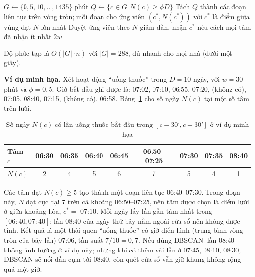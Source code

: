 \begin{algorithm}[htbp]
\caption{Tìm thói quen của một hoạt động trên một loại ngày (quét cửa sổ)}
\label{alg:scan}
$G \leftarrow \{0, 5, 10, \dots, 1435\}$ phút 
$Q \leftarrow \{ c \in G : N(c) \ge \phi D\}$\;
Tách $Q$ thành các đoạn liên tục trên vòng tròn; mỗi đoạn cho ứng viên $(c^\ast, N(c^\ast))$ với
$c^\ast$ là điểm giữa vùng đạt $N$ lớn nhất\;
Duyệt ứng viên theo $N$ giảm dần, nhận $c^\ast$ nếu cách mọi tâm đã nhận ít nhất $2w$\;
\end{algorithm}

Độ phức tạp là $O(|G| \cdot n)$ với $|G| = 288$, đủ nhanh cho mọi nhà (dưới một giây).

\textbf{Ví dụ minh họa.} Xét hoạt động ``uống thuốc'' trong $D = 10$ ngày, với $w = 30$ phút và
$\phi = 0{,}5$. Giờ bắt đầu ghi được là: 07:02, 07:10, 06:55, 07:20, (không có), 07:05, 08:40, 07:15,
(không có), 06:58. Bảng~\ref{tab:scan-example} cho số ngày $N(c)$ tại một số tâm trên lưới.

\begin{table}[htbp]
\centering
\caption{Số ngày $N(c)$ có lần uống thuốc bắt đầu trong $[c - 30', c + 30']$ ở ví dụ minh họa}
\label{tab:scan-example}
\small
\begin{tabular}{lcccccccc}
\toprule
Tâm $c$ & 06:30 & 06:35 & 06:40 & 06:45 & 06:50--07:25 & 07:30 & 07:35 & 08:40 \\
\midrule
$N(c)$ & 2 & 4 & 5 & 6 & 7 & 5 & 4 & 1 \\
\bottomrule
\end{tabular}
\end{table}

Các tâm đạt $N(c) \ge 5$ tạo thành một đoạn liên tục 06:40--07:30. Trong đoạn này, $N$ đạt cực đại 7
trên cả khoảng 06:50--07:25, nên tâm được chọn là điểm lưới ở giữa khoảng hòa, $c^\ast = $ 07:10. Mỗi ngày
lấy lần gần tâm nhất trong $[06{:}40, 07{:}40]$: lần 08:40 của ngày thứ bảy nằm ngoài cửa sổ nên không được
tính. Kết quả là một thói quen ``uống thuốc'' có giờ điển hình (trung bình vòng tròn của bảy lần) 07:06, tần
suất $7/10 = 0{,}7$. Nếu dùng DBSCAN, lần 08:40 không ảnh hưởng ở ví dụ này; nhưng khi có thêm vài lần ở
07:45, 08:10, 08:30, DBSCAN sẽ nối dần cụm tới 08:40, còn quét cửa sổ vẫn giữ khung không rộng quá một giờ.

